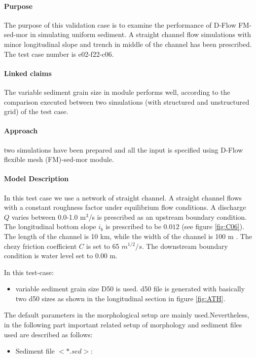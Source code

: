 \label{case:e02-f22-c06}
\paragraph*{Purpose}

The purpose of this validation case is to examine the performance of D-Flow FM-sed-mor in simulating uniform sediment. A straight channel flow simulations with minor longitudinal slope and trench in middle of the channel has been prescribed. The test case number is e02-f22-c06.
\paragraph*{Linked claims}
The variable sediment grain size in module performs well, according to the comparison executed between two simulations (with structured and unstructured grid) of the test case.
\paragraph*{Approach}
two simulations have been prepared
and all the input is specified using D-Flow flexible mesh (FM)-sed-mor module.

\paragraph*{Model Description}
In this test case  we use a network of straight channel. A straight channel flows with a constant roughness factor under equilibrium flow conditions. A discharge $Q$ varies between 0.0-1.0 m$^3$/s is prescribed as an upstream boundary condition. The longitudinal bottom slope $i_b$ is prescribed to be $0.012$ (see figure \ref{fig:C06}). The length of the channel is 10 km, while the width of the channel is 100 m . The chezy friction coefficient $C$ is set to 65 $m^{1/2}/s$. The downstream boundary condition is water level set to 0.00 m.

In this test-case:
\begin{itemize}
	\item[$\bullet$] variable sediment grain size D{50} is used. d50 file is generated with basically two d50 sizes as shown in the longitudinal section in figure \ref{fig:ATH}.
\end{itemize}
The default parameters in the morphological setup are mainly used.Nevertheless, in the following part  important related setup of morphology and sediment files used are described as follows:
\begin{itemize}
	\item[$\bullet$] Sediment file $<*.sed>$:
\end{itemize}

